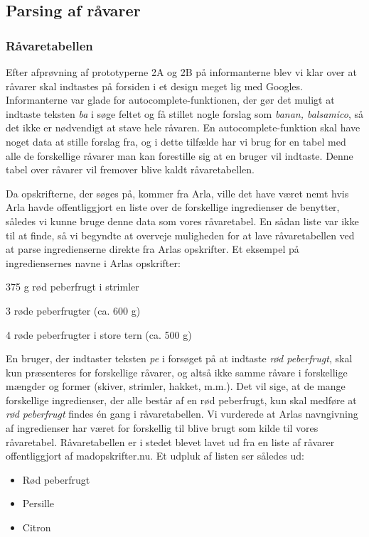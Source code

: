 \subsection{Parsing af råvarer}

\subsubsection{Råvaretabellen}
\label{subsec:parsingafraavarer}
Efter afprøvning af prototyperne 2A og 2B på informanterne blev vi klar over at råvarer skal indtastes på forsiden i et design meget lig med Googles. Informanterne var glade for autocomplete-funktionen, der gør det muligt at indtaste teksten \textit{ba} i søge feltet og få stillet nogle forslag som \fx \textit{banan, balsamico}, så det ikke er nødvendigt at stave hele råvaren.
En autocomplete-funktion skal have noget data at stille forslag fra, og i dette tilfælde har vi brug for en tabel med alle de forskellige råvarer man kan forestille sig at en bruger vil indtaste. Denne tabel over råvarer vil fremover blive kaldt råvaretabellen.

Da opskrifterne, der søges på, kommer fra Arla, ville det have været nemt hvis Arla havde offentliggjort en liste over de forskellige ingredienser de benytter, således vi kunne bruge denne data som vores råvaretabel. En sådan liste var ikke til at finde, så vi begyndte at overveje muligheden for at lave råvaretabellen ved at parse ingredienserne direkte fra Arlas opskrifter. Et eksempel på ingrediensernes navne i Arlas opskrifter:

375 g rød peberfrugt i strimler

3 røde peberfrugter (ca. 600 g)

4 røde peberfrugter i store tern (ca. 500 g)

En bruger, der indtaster teksten \textit{pe} i forsøget på at indtaste \textit{rød peberfrugt}, skal kun præsenteres for forskellige råvarer, og altså ikke samme råvare i forskellige mængder og former (skiver, strimler, hakket, m.m.). Det vil sige, at de mange forskellige ingredienser, der alle består af en rød peberfrugt, kun skal medføre at \textit{rød peberfrugt} findes én gang i råvaretabellen. Vi vurderede at Arlas navngivning af ingredienser har været for forskellig til blive brugt som kilde til vores råvaretabel. Råvaretabellen er i stedet blevet lavet ud fra en liste af råvarer offentliggjort af madopskrifter.nu. Et udpluk af listen ser således ud:

\begin{itemize}
\item Rød peberfrugt
\item Persille
\item Citron
\end{itemize}

